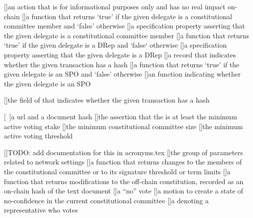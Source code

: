 [\protect{}]{an action that is for informational purposes only and has no real impact on-chain}
[\protect{}]{a function that returns `true' if the given delegate is a constitutional committee member and `false' otherwise}
[\protect{}]{a specification property asserting that the given delegate is a constitutional committee member}
[\protect{}]{a function that returns `true' if the given delegate is a DRep and `false` otherwise}
[\protect{}]{a specification property asserting that the given delegate is a DRep}
[\protect{}]{a record that indicates whether the given transaction has a hash}
[\protect{}]{a function that returns `true' if the given delegate is an SPO and `false' otherwise}
[\protect{}]{an function indicating whether the given delegate is an SPO}

[\protect{}]{the field of \isHashableSet that indicates whether the given transaction has a hash}

[\protect{}~\protect{}]{a url and a document hash}
[\protect{}]{the assertion that the \activeVotingStake is at least the minimum active voting stake}
[\protect{}]{the minimum constitutional committee size}
[\protect{}]{the minimum active voting threshold}

[\protect{}]{TODO: add documentation for this in acronyms.tex}
[\protect{}]{the group of parameters related to network settings}
[\protect{}]{a function that returns changes to the members of the constitutional committee or to its signature threshold or term limits}
[\protect{}]{a function that returns modifications to the off-chain constitution, recorded as an on-chain hash of the text document}
[\protect{}]{a ``no'' vote}
[\protect{}]{a motion to create a state of no-confidence in the current constitutional committee}
[\protect{}]{a \VDeleg denoting a representative who votes \NoConfidence}

